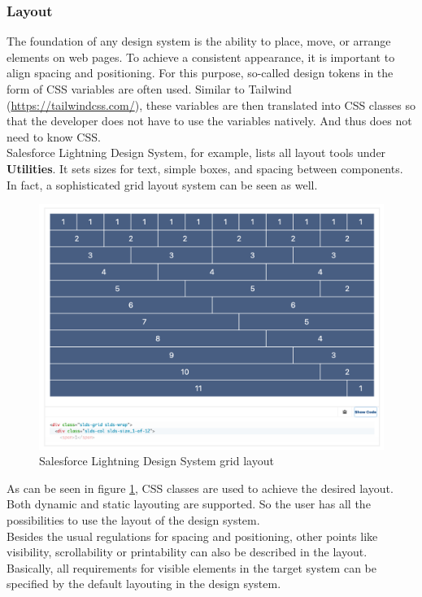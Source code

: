 \subsubsection{Layout}
The foundation of any design system is the ability to place, move, or arrange elements on web pages. To achieve a consistent appearance, it is important to align spacing and positioning. 
For this purpose, so-called design tokens in the form of CSS variables are often used. Similar to Tailwind (\url{https://tailwindcss.com/}), these variables are then translated into CSS classes so that the developer does not have to use the variables natively. And thus does not need to know CSS.  \\
Salesforce Lightning Design System, for example, lists all layout tools under \textbf{Utilities}. It sets sizes for text, simple boxes, and spacing between components. In fact, a sophisticated grid layout system can be seen as well. \\

\begin{figure}[hbtp]
	\centerline{\includegraphics[width=\linewidth]{images/salesforce_lightning_layout.png}}
	\caption{Salesforce Lightning Design System grid layout \cite{lightning_design_system_lightning_nodate}}
	\label{salesforce_lightning_layout}
\end{figure}

As can be seen in figure \ref{salesforce_lightning_layout}, CSS classes are used to achieve the desired layout. Both dynamic and static layouting are supported. So the user has all the possibilities to use the layout of the design system. \\
Besides the usual regulations for spacing and positioning, other points like visibility, scrollability or printability can also be described in the layout. Basically, all requirements for visible elements in the target system can be specified by the default layouting in the design system.

